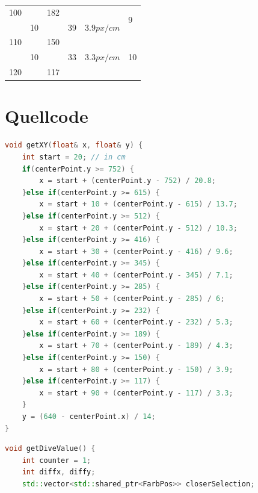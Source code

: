 \begin{appendix}
\begin{table}[h]
\begin{center}
\begin{tabular}[]{| l | l | l | l | l | l |}
                    100     &            & 182   &                &              & \multirow{2}{1cm}{9} \\
                            & 10         &       & 39             & $3.9 px/cm$  & \\
                    \hline

                    110     &            & 150   &                &              & \multirow{3}{1cm}{10} \\
                            & 10         &       & 33             & $3.3 px/cm$  & \\
                    \hline
                    120     &            & 117   &                &              & \\
                    \hline

                \end{tabular}
            \end{center}
        \end{table}

    \chapter{Quellcode}

\begin{lstlisting}[language=c++,
                   caption={Funktion: "`getXY''},
                   label={lst:getxy}]
void getXY(float& x, float& y) {
    int start = 20; // in cm
    if(centerPoint.y >= 752) {
        x = start + (centerPoint.y - 752) / 20.8;
    }else if(centerPoint.y >= 615) {
        x = start + 10 + (centerPoint.y - 615) / 13.7;
    }else if(centerPoint.y >= 512) {
        x = start + 20 + (centerPoint.y - 512) / 10.3;
    }else if(centerPoint.y >= 416) {
        x = start + 30 + (centerPoint.y - 416) / 9.6;
    }else if(centerPoint.y >= 345) {
        x = start + 40 + (centerPoint.y - 345) / 7.1;
    }else if(centerPoint.y >= 285) {
        x = start + 50 + (centerPoint.y - 285) / 6;
    }else if(centerPoint.y >= 232) {
        x = start + 60 + (centerPoint.y - 232) / 5.3;
    }else if(centerPoint.y >= 189) {
        x = start + 70 + (centerPoint.y - 189) / 4.3;
    }else if(centerPoint.y >= 150) {
        x = start + 80 + (centerPoint.y - 150) / 3.9;
    }else if(centerPoint.y >= 117) {
        x = start + 90 + (centerPoint.y - 117) / 3.3;
    }
    y = (640 - centerPoint.x) / 14;
}
\end{lstlisting}

\begin{lstlisting}[language=c++,
                   caption={Funktion: "`getDiceValue''},
                   label={lst:getDiveValue1}]
void getDiveValue() {
    int counter = 1;
    int diffx, diffy;
    std::vector<std::shared_ptr<FarbPos>> closerSelection;


\end{lstlisting}
\end{appendix}
